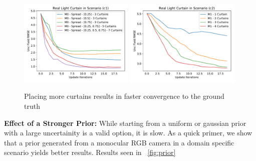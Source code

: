\begin{figure}[h]
    \centering
    \begin{minipage}{0.5\textwidth}
        \centering
        \includegraphics[width=0.49\textwidth]{figures/Figure_3.pdf}
        \includegraphics[width=0.49\textwidth]{figures/Figure_4.pdf}
    \end{minipage}\hfill
    \centering
    \caption{Placing more curtains results in faster convergence to the ground truth}
    \label{fig:figure34}
\end{figure}

\textbf{Effect of a Stronger Prior:} While starting from a uniform or gaussian prior with a large uncertainity is a valid option, it is slow. As a quick primer, we show that a prior generated from a monocular RGB camera in a domain specific scenario yields better results. Results seen in ~\ref{fig:prior}

